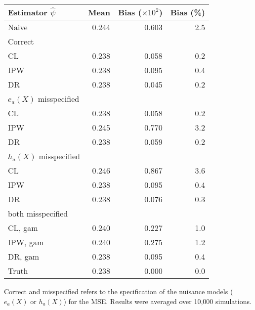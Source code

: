 \begin{table}[t]
    \centering
    \footnotesize
    \begin{threeparttable}
\begin{tabular}{lrrr}
\toprule
Estimator $\widehat{\psi}$ & Mean & Bias ($\times 10^2$) & Bias (\%) \\
\midrule
Naive & 0.244 & 0.603 & 2.5\\
\addlinespace[0.25em]
Correct & & & \\
\hspace{1em}CL & 0.238 & 0.058 & 0.2\\
\hspace{1em}IPW & 0.238 & 0.095 & 0.4\\
\hspace{1em}DR & 0.238 & 0.045 & 0.2\\
\addlinespace[0.25em]
$e_a(X)$ misspecified & & & \\
\hspace{1em}CL & 0.238 & 0.058 & 0.2\\
\hspace{1em}IPW & 0.245 & 0.770 & 3.2\\
\hspace{1em}DR & 0.238 & 0.059 & 0.2\\
\addlinespace[0.25em] 
$h_a(X)$ misspecified & & & \\
\hspace{1em}CL & 0.246 & 0.867 & 3.6\\
\hspace{1em}IPW & 0.238 & 0.095 & 0.4\\
\hspace{1em}DR & 0.238 & 0.076 & 0.3\\
\addlinespace[0.25em] 
both misspecified & & & \\
\hspace{1em}CL, gam & 0.240 & 0.227 & 1.0\\
\hspace{1em}IPW, gam & 0.240 & 0.275 & 1.2\\
\hspace{1em}DR, gam & 0.238 & 0.095 & 0.4\\
\addlinespace[0.25em] 
Truth & 0.238 & 0.000 & 0.0\\
\bottomrule
\end{tabular}
\begin{tablenotes}
\item Correct and misspecified refers to the specification of the nuisance models ($e_a(X)$ or $h_a(X)$) for the MSE. Results were averaged over 10,000 simulations. 
\end{tablenotes}
\end{threeparttable}
\end{table}

